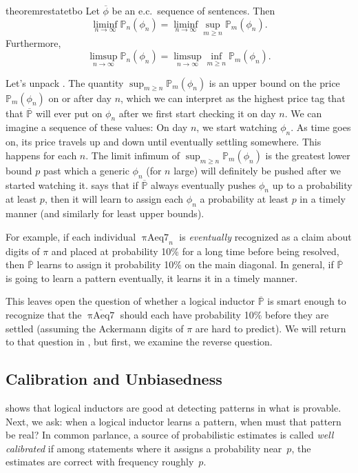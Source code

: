 \documentclass[authordate,onecolumn,noenvironments]{miri-tech-article}
\numberwithin{equation}{subsection}
\newcommand{\seq}[1]{{\overline{#1}}}
\newcommand{\prob}{p}
\newcommand{\mm}{m}
\newcommand{\nn}{n}
\newcommand{\phis}{\seq{\phi}}
\newcommand{\ec}[1][\ ]{e.c.#1}
\newcommand{\rparenthetical}[1]{\hfill\upshape{{\small (#1)}}} %
\newcommand{\proofin}[1]{\rparenthetical{Proof in:~#1.}}
\newcommand{\BelState}{\mathbb{P}}
\newcommand{\pt}{\BelState}
\newcommand{\MP}{\seq{\pt}}
\newcommand{\piasev}{\mathit{\operatorname{\pi Aeq7}}}
\begin{document}
\begin{restatable}{theorem}{restatetbo}\label{thm:tbo}
  Let $\phis$ be an \ec sequence of sentences. Then
  \[
    \liminf_{\nn \to\infty} \pt_\nn(\phi_\nn) = \liminf_{\nn \to\infty} \sup_{\mm \ge \nn} \pt_\mm(\phi_\nn).
  \]
  Furthermore,
  \[
    \limsup_{\nn \to\infty} \pt_\nn(\phi_\nn) = \limsup_{\nn \to\infty}\inf_{\mm \ge \nn} \pt_\mm(\phi_\nn).
  \]
  \proofin{\ref{app:tbo}}
\end{restatable}

Let's unpack . The quantity $\sup_{\mm \ge \nn} \pt_\mm(\phi_\nn)$ is an upper bound on the price $\pt_\mm(\phi_\nn)$ on or after day $\nn$, which we can interpret as the highest price tag that that $\MP$ will ever put on $\phi_\nn$ after we first start checking it on day $\nn$. We can imagine a sequence of these values: On day $\nn$, we start watching $\phi_\nn$. As time goes on, its price travels up and down until eventually settling somewhere. This happens for each $\nn$. The limit infimum of $\sup_{\mm \ge \nn} \pt_\mm(\phi_\nn)$ is the greatest lower bound $p$ past which a generic $\phi_\nn$ (for $\nn$ large) will definitely be pushed after we started watching it.  says that if $\MP$ always eventually pushes $\phi_\nn$ up to a probability at least $p$, then it will learn to assign each $\phi_\nn$ a probability at least $p$ in a timely manner (and similarly for least upper bounds).

For example, if each individual $\piasev_\nn$ is \emph{eventually} recognized as a claim about digits of $\pi$ and placed at probability 10\% for a long time before being resolved, then $\MP$ learns to assign it probability 10\% on the main diagonal. In general, if $\MP$ is going to learn a pattern eventually, it learns it in a timely manner.

This leaves open the question of whether a logical inductor $\MP$ is smart enough to recognize that the $\seq{\piasev}$ should each have probability 10\% before they are settled (assuming the Ackermann digits of $\pi$ are hard to predict). We will return to that question in , but first, we examine the reverse question.




\subsection{Calibration and Unbiasedness}\label{sec:calibration}

 shows that logical inductors are good at detecting patterns in what is provable. Next, we ask: when a logical inductor learns a pattern, when must that pattern be real? In common parlance, a source of probabilistic estimates is called \emph{well calibrated} if among statements where it assigns a probability near~$\prob$, the estimates are correct with frequency roughly~$\prob$.
\end{document}
